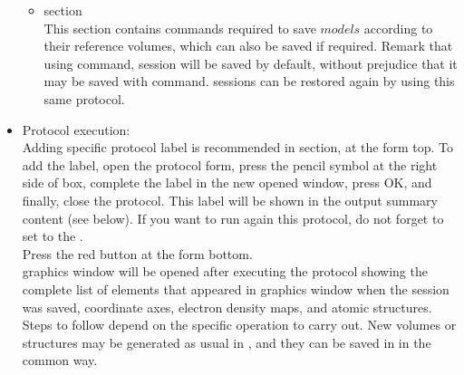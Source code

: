 \begin{itemize}
\begin{itemize}
\begin{itemize}
    \end{itemize}
    \item {} section\\
    
    This section contains \chimera commands required to save $models$ according to their reference volumes, which can also be saved if required. Remark that using  command, \chimera session will be saved by default, without prejudice that it may be saved with  command. \chimera sessions can be restored again by using this same  protocol.\\
    
    \end{itemize}

  \item Protocol execution:\\
  
  Adding specific protocol label is recommended in  section, at the form top. To add the label, open the protocol form, press the pencil symbol at the right side of  box, complete the label in the new opened window, press OK, and finally, close the protocol. This label will be shown in the output summary content (see below). If you want to run again this protocol, do not forget to set to  the .\\
  Press the  red button at the form bottom.\\
  
  \chimera graphics window will be opened after executing the protocol showing the complete list of elements that appeared in \chimera graphics window when the session was saved, coordinate axes, electron density maps, and atomic structures. Steps to follow depend on the specific operation to carry out. New volumes or structures may be generated as usual in \chimera, and they can be saved in \scipion in the common way.\\
  \begin{itemize}
   

\end{itemize}
\end{itemize}
